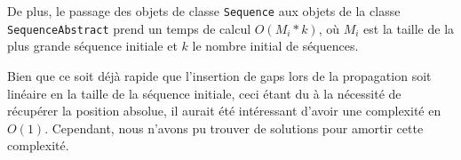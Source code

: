 De plus, le passage des objets de classe \verb|Sequence| aux objets de la classe
\verb|SequenceAbstract| prend un temps de calcul $O(M_{i} * k)$, où $M_{i}$ est
la taille de la plus grande séquence initiale et $k$ le nombre initial de
séquences.

Bien que ce soit déjà rapide que l'insertion de gaps lors de la propagation soit
linéaire en la taille de la séquence initiale, ceci étant du à la nécessité de
récupérer la position absolue, il aurait été intéressant d'avoir une complexité
en $O(1)$. Cependant, nous n'avons pu trouver de solutions pour amortir cette
complexité.

